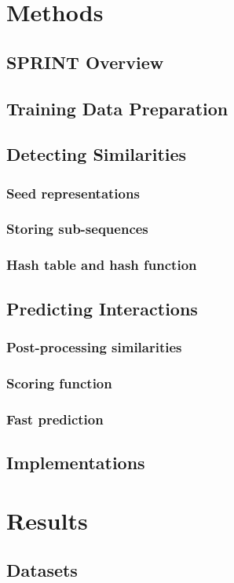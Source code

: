 \section{Methods}
\subsection{SPRINT Overview}
\subsection{Training Data Preparation}
\subsection{Detecting Similarities}
\subsubsection{Seed representations}
\subsubsection{Storing sub-sequences}
\subsubsection{Hash table and hash function}
\subsection{Predicting Interactions}
\subsubsection{Post-processing similarities}
\subsubsection{Scoring function}
\subsubsection{Fast prediction}
\subsection{Implementations}
\section{Results}
\subsection{Datasets}

